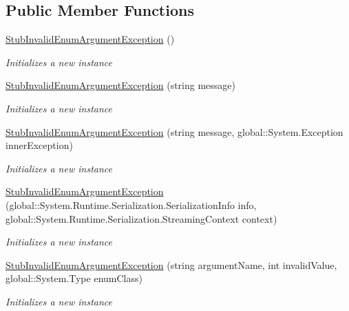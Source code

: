 \subsection*{Public Member Functions}
\begin{DoxyCompactItemize}
\item 
\hyperlink{class_system_1_1_component_model_1_1_fakes_1_1_stub_invalid_enum_argument_exception_a8ff93dd8064faad912de7e61203f2333}{Stub\-Invalid\-Enum\-Argument\-Exception} ()
\begin{DoxyCompactList}\small\item\em Initializes a new instance\end{DoxyCompactList}\item 
\hyperlink{class_system_1_1_component_model_1_1_fakes_1_1_stub_invalid_enum_argument_exception_a12d91ed5e3d121cdfedc005e2a454ec8}{Stub\-Invalid\-Enum\-Argument\-Exception} (string message)
\begin{DoxyCompactList}\small\item\em Initializes a new instance\end{DoxyCompactList}\item 
\hyperlink{class_system_1_1_component_model_1_1_fakes_1_1_stub_invalid_enum_argument_exception_a84c4718db118b27400db7105ce051a72}{Stub\-Invalid\-Enum\-Argument\-Exception} (string message, global\-::\-System.\-Exception inner\-Exception)
\begin{DoxyCompactList}\small\item\em Initializes a new instance\end{DoxyCompactList}\item 
\hyperlink{class_system_1_1_component_model_1_1_fakes_1_1_stub_invalid_enum_argument_exception_ac6aee0bc8e10d1860fdc3d23e24e25cf}{Stub\-Invalid\-Enum\-Argument\-Exception} (global\-::\-System.\-Runtime.\-Serialization.\-Serialization\-Info info, global\-::\-System.\-Runtime.\-Serialization.\-Streaming\-Context context)
\begin{DoxyCompactList}\small\item\em Initializes a new instance\end{DoxyCompactList}\item 
\hyperlink{class_system_1_1_component_model_1_1_fakes_1_1_stub_invalid_enum_argument_exception_a916649b04bcf0526335e0a0b307c762f}{Stub\-Invalid\-Enum\-Argument\-Exception} (string argument\-Name, int invalid\-Value, global\-::\-System.\-Type enum\-Class)
\begin{DoxyCompactList}\small\item\em Initializes a new instance\end{DoxyCompactList}\item 

\end{DoxyCompactItemize}
